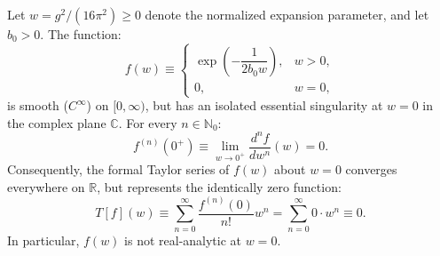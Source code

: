 \begin{proposition}
\label{prop:non_analyticity}
Let $w = g^2 / (16\pi^2) \ge 0$ denote the normalized expansion parameter, and let $b_0 > 0$. The function:
\begin{equation}
\label{eq:transmutation_scalar_function}
f(w) \equiv \begin{cases} \exp\left( -\dfrac{1}{2 b_0 w} \right), & w > 0, \\ 0, & w = 0, \end{cases}
\end{equation}
is smooth ($C^\infty$) on $[0, \infty)$, but has an isolated essential singularity at $w = 0$ in the complex plane $\mathbb{C}$. For every $n \in \mathbb{N}_0$:
\begin{equation}
\label{eq:derivatives_vanish}
f^{(n)}(0^+) \equiv \lim_{w \to 0^+} \frac{d^n f}{dw^n}(w) = 0.
\end{equation}
Consequently, the formal Taylor series of $f(w)$ about $w = 0$ converges everywhere on $\mathbb{R}$, but represents the identically zero function:
\begin{equation}
\label{eq:taylor_series_zero}
T[f](w) \equiv \sum_{n=0}^\infty \frac{f^{(n)}(0)}{n!} w^n = \sum_{n=0}^\infty 0 \cdot w^n \equiv 0.
\end{equation}
In particular, $f(w)$ is not real-analytic at $w = 0$.
\end{proposition}

